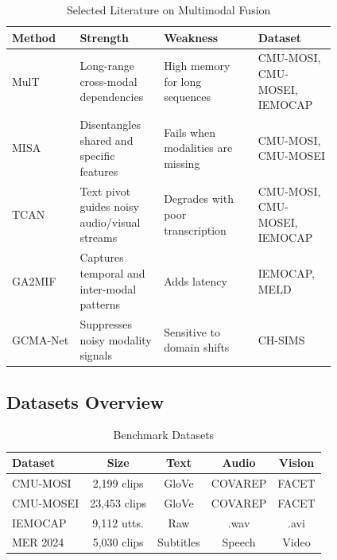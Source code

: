 \documentclass[conference]{IEEEtran}
\begin{document}
\begin{table}[h]
\renewcommand{\arraystretch}{1.3}
\caption{Selected Literature on Multimodal Fusion}
\label{tab:literature}
\centering
\begin{tabular}{|p{0.18\linewidth}|p{0.18\linewidth}|p{0.25\linewidth}|p{0.2\linewidth}|}
\hline
\textbf{Method} & \textbf{Strength} & \textbf{Weakness} & \textbf{Dataset} \\
\hline
MulT \cite{tsai2019multimodal} & Long-range cross-modal dependencies & High memory for long sequences & CMU-MOSI, CMU-MOSEI, IEMOCAP \\
\hline
MISA \cite{hazarika2020misa} & Disentangles shared and specific features & Fails when modalities are missing & CMU-MOSI, CMU-MOSEI \\
\hline
TCAN \cite{wu2021text} & Text pivot guides noisy audio/visual streams & Degrades with poor transcription & CMU-MOSI, CMU-MOSEI, IEMOCAP \\
\hline
GA2MIF \cite{li2023graph} & Captures temporal and inter-modal patterns & Adds latency & IEMOCAP, MELD \\
\hline
GCMA-Net \cite{lian2023gcma} & Suppresses noisy modality signals & Sensitive to domain shifts & CH-SIMS \\
\hline
\end{tabular}
\end{table}

\subsection{Datasets Overview}

\begin{table}[h]
\renewcommand{\arraystretch}{1.3}
\caption{Benchmark Datasets}
\label{tab:datasets}
\centering
\begin{tabular}{|l|c|c|c|c|}
\hline
\textbf{Dataset} & \textbf{Size} & \textbf{Text} & \textbf{Audio} & \textbf{Vision} \\
\hline
CMU-MOSI \cite{zadeh2016mosi} & 2,199 clips & GloVe & COVAREP & FACET \\
\hline
CMU-MOSEI \cite{zadeh2018multimodal} & 23,453 clips & GloVe & COVAREP & FACET \\
\hline
IEMOCAP \cite{busso2008iemocap} & 9,112 utts. & Raw & .wav & .avi \\
\hline
MER 2024 \cite{lian2024mer} & 5,030 clips & Subtitles & Speech & Video \\
\hline
\end{tabular}
\end{table}
\end{document}
